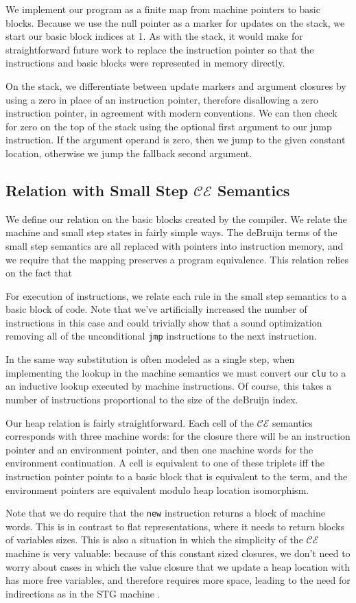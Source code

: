 We implement our program as a finite map from machine pointers to basic blocks. 
Because we use the null pointer as a marker for updates on the stack, we start
our basic block indices at 1. As with the stack, it would make for
straightforward future work to replace the instruction pointer so that the
instructions and basic blocks were represented in memory directly. 

On the stack, we differentiate between update markers and argument closures by
using a zero in place of an instruction pointer, therefore disallowing a zero
instruction pointer, in agreement with modern conventions. We can then check for
zero on the top of the stack using the optional first argument to our jump
instruction. If the argument operand is zero, then we jump to the given
constant location, otherwise we jump the fallback second argument. 

\subsection{Relation with Small Step $\mathcal{CE}$ Semantics}

We define our relation on the basic blocks created by the compiler. We relate
the machine and small step states in fairly simple ways. The deBruijn terms of
the small step semantics are all replaced with pointers into instruction memory,
and we require that the mapping preserves a program equivalence. This relation
relies on the fact that 

For execution of instructions, we relate each rule in the small step semantics
to a basic block of code. Note that we've artificially increased the number of
instructions in this case and could trivially show that a sound optimization
removing all of the unconditional \texttt{jmp} instructions to the next
instruction. 

In the same way substitution is often modeled as a single step, when
implementing the lookup in the machine semantics we must convert our
\texttt{clu} to a an inductive lookup executed by machine instructions. Of
course, this takes a number of instructions proportional to the size of the
deBruijn index. 

Our heap relation is fairly straightforward. Each cell of the $\mathcal{CE}$
semantics corresponds with three machine words: for the closure there will be an
instruction pointer and an environment pointer, and then one machine words for
the environment continuation. A cell is equivalent to one of these triplets iff
the instruction pointer points to a basic block that is equivalent to the term,
and the environment pointers are equivalent modulo heap location isomorphism.

Note that we do require that the \texttt{new} instruction returns a block of
machine words. This is in contrast to flat representations, where it needs to
return blocks of variables sizes. This is also a situation in which the
simplicity of the $\mathcal{CE}$ machine is very valuable: because of this
constant sized closures, we don't need to worry about cases in which the
value closure that we update a heap location with has more free variables, and
therefore requires more space, leading to the need for indirections as in the
STG machine \cite{STG}.


